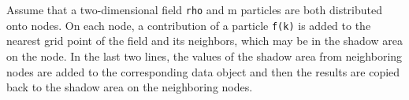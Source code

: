 Assume that a two-dimensional field {\tt rho} and m particles are
both distributed onto nodes. On each node, a contribution of a particle
{\tt f(k)} is added to the nearest grid point of the field and its
neighbors, which may be in the shadow area on the node. In the last two
lines, the values of the shadow area from neighboring nodes are added to
the corresponding data object and then the results are copied back to
the shadow area on the neighboring nodes.
